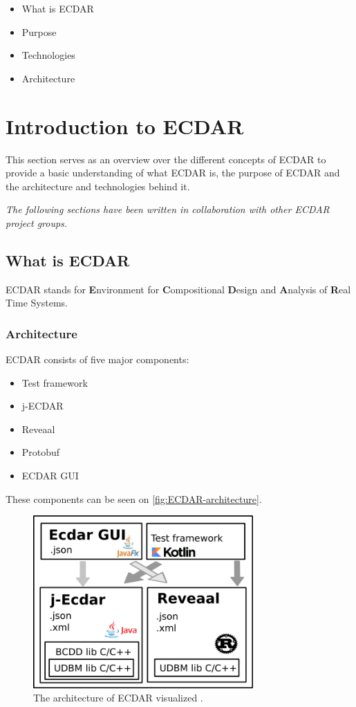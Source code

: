
\begin{itemize}
\item What is ECDAR
\item Purpose
\item Technologies
\item Architecture 
\end{itemize}

\section{Introduction to ECDAR}
This section serves as an overview over the different concepts of ECDAR to provide a basic understanding of what ECDAR is, the purpose of ECDAR and the architecture and technologies behind it. 

\textit{The following sections have been written in collaboration with other ECDAR
project groups.}

\subsection{What is ECDAR}
ECDAR stands for \textbf{E}nvironment for \textbf{C}ompositional \textbf{D}esign and \textbf{A}nalysis of \textbf{R}eal Time Systems.


\subsubsection{Architecture}
ECDAR consists of five major components:
\begin{itemize}
    \item Test framework
    \item j-ECDAR
    \item Reveaal
    \item Protobuf
    \item ECDAR GUI
\end{itemize}
These components can be seen on \autoref{fig:ECDAR-architecture}.

\begin{figure}[H]
    \centering
    \includegraphics[width=0.75\textwidth]{common/figures/ArchOverview.png}
    \caption{The architecture of ECDAR visualized \cite{ECDARNET}.}
    \label{fig:ECDAR-architecture}
\end{figure}


